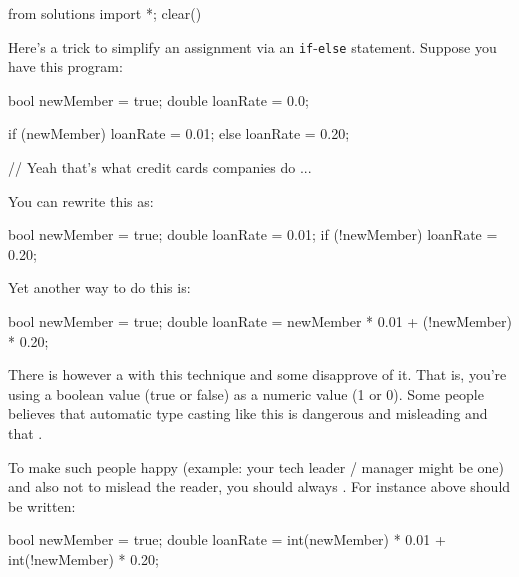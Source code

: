 \begin{python0}
from solutions import *; clear()
\end{python0}

Here's a trick to simplify an assignment via an
\texttt{if}-\texttt{else} statement. Suppose you have this program:\\
\begin{console}
bool newMember = true;
double loanRate = 0.0;

if (newMember)
   loanRate = 0.01;
else
   loanRate = 0.20;

// Yeah that's what credit cards companies do ... 
\end{console}

You can rewrite this as:
\begin{console}
bool newMember = true;
double loanRate = 0.01;
if (!newMember)
   loanRate = 0.20; 
\end{console}

Yet another way to do this is:
\begin{console}
bool newMember = true;
double loanRate = newMember * 0.01
                  + (!newMember) * 0.20; 
\end{console}

There is however a  with this technique and some disapprove of it. That is, you're using a boolean value (true or false) as a numeric value (1 or 0). Some people believes that automatic type casting like this is dangerous and misleading and that .

To make such people happy (example: your tech leader / manager might be one) and also not to mislead the reader, you should always . For instance above should be written:\\
\begin{console}
bool newMember = true;
double loanRate = int(newMember) * 0.01
                  + int(!newMember) * 0.20; 
\end{console}

